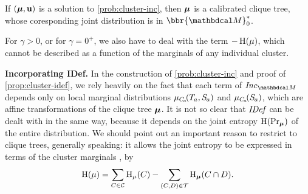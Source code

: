 \documentclass[twoside]{article}
\begin{document}
\begin{prop} \label{prop:cluster-idef}
    If $(\boldsymbol\mu, \mathbf{u})$ is a solution to \eqref{prob:cluster-inc}, then 
    $\boldsymbol\mu$ is a calibrated clique tree, whose coresponding joint distribution 
    is in $\bbr{\dg M}^*_0$.
\end{prop}

For $\gamma > 0$, or for $\gamma = 0^+$, we also have to deal with the term $-\operatorname{\mathrm{H}}(\mu)$, which cannot be described as a function of the marginals of any individual cluster. 

\textbf{Incorporating IDef.}
%
In the construction of \eqref{prob:cluster-inc}
and proof of \cref{prop:cluster-idef}, we rely
heavily on the fact that 
each term of $\Inc_{\dg M}$
depends only on local marginal distributions $\mu_{C_{\mskip-2mu a}}\!(\Tgt a,  \Src a)$
and $\mu_{C_{\mskip-2mu a}}\!(\Src a)$,
which are affine transformations of the clique tree $\boldsymbol\mu$. 
It is not so clear that $\mathit{IDef}_{\!}$ can be dealt with in the same way, because it depends on the joint entropy $\operatorname{\mathrm{H}}(\Pr_{\boldsymbol\mu})$ of the entire distribution.
We should point out an important reason to restrict to clique trees, generally speaking: 
it allows the joint entropy to be expressed 
in terms of the cluster marginals \parencite{wainwright2008graphical}, 
by
\begin{equation}\label{eq:bethe-entropy}
    \operatorname{\mathrm{H}}(\mu) 
        = \sum_{C \in \mathcal C} \operatorname{\mathrm{H}}_\mu(C) 
        - \sum_{(C,D) \in \mathcal T} \operatorname{\mathrm{H}}_{\boldsymbol\mu}(C \cap D).
\end{equation}
\end{document}
